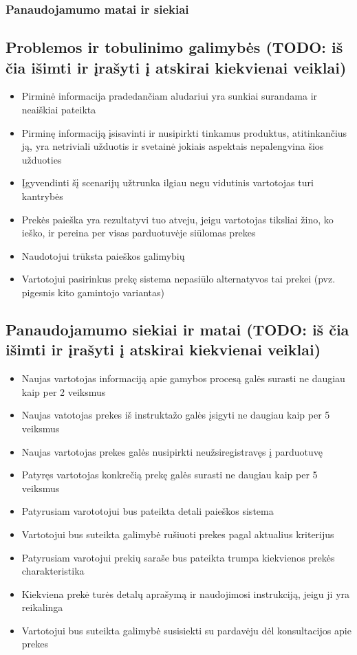 \documentclass[oneside]{VUMIFPSkursinis}
\begin{document}
		\subsubsection{Panaudojamumo matai ir siekiai}
	\subsection{Problemos ir tobulinimo galimybės (TODO: iš čia išimti ir įrašyti į atskirai kiekvienai veiklai)}
		\begin{itemize}
			\item{Pirminė informacija pradedančiam aludariui yra sunkiai surandama ir neaiškiai pateikta}
			\item{Pirminę informaciją įsisavinti ir nusipirkti tinkamus produktus, atitinkančius ją, yra netriviali užduotis ir svetainė jokiais aspektais nepalengvina šios užduoties}
			\item{Įgyvendinti šį scenarijų užtrunka ilgiau negu vidutinis vartotojas turi kantrybės}
			\item{Prekės paieška yra rezultatyvi tuo atveju, jeigu vartotojas tiksliai žino, ko ieško, ir pereina per visas parduotuvėje siūlomas prekes}
			\item{Naudotojui trūksta paieškos galimybių}
			\item{Vartotojui pasirinkus prekę sistema nepasiūlo alternatyvos tai prekei (pvz. pigesnis kito gamintojo variantas)}
		\end{itemize}
	\subsection{Panaudojamumo siekiai ir matai (TODO: iš čia išimti ir įrašyti į atskirai kiekvienai veiklai)}
		\begin{itemize}
			\item{Naujas vartotojas informaciją apie gamybos procesą galės surasti ne daugiau kaip per 2 veiksmus}
			\item{Naujas vatotojas prekes iš instruktažo galės įsigyti ne daugiau kaip per 5 veiksmus}
			\item{Naujas vartotojas prekes galės nusipirkti neužsiregistravęs į parduotuvę}
			\item{Patyręs vartotojas konkrečią prekę galės surasti ne daugiau kaip per 5 veiksmus}
			\item{Patyrusiam varototojui bus pateikta detali paieškos sistema}
			\item{Vartotojui bus suteikta galimybė rušiuoti prekes pagal aktualius kriterijus}
			\item{Patyrusiam varotojui prekių saraše bus pateikta trumpa kiekvienos prekės charakteristika}
			\item{Kiekviena prekė turės detalų aprašymą ir naudojimosi instrukciją, jeigu ji yra reikalinga}
			\item{Vartotojui bus suteikta galimybė susisiekti su pardavėju dėl konsultacijos apie prekes}
		\end{itemize}
\end{document}
